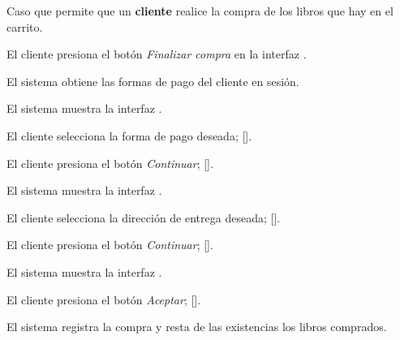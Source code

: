 %
%

{
  Caso que permite que un \textbf{cliente} realice la compra de los libros que
  hay en el carrito.

  \begin{trayectoriaPrincipal}

    \item El cliente presiona el botón \textit{Finalizar compra} en la
      interfaz .

    \item El sistema obtiene las formas de pago del cliente en sesión.

    \item El sistema muestra la interfaz
      .

    \item El cliente selecciona la forma de pago deseada;
      [].

    \item El cliente presiona el botón \textit{Continuar};
      [].

    \item El sistema muestra la interfaz
      .

    \item El cliente selecciona la dirección de entrega deseada;
      [].

    \item El cliente presiona el botón \textit{Continuar};
      [].

    \item El sistema muestra la interfaz
      .

    \item El cliente presiona el botón \textit{Aceptar};
      [].


    \item El sistema registra la compra y resta de las existencias los libros
      comprados.


\end{trayectoriaPrincipal}}

